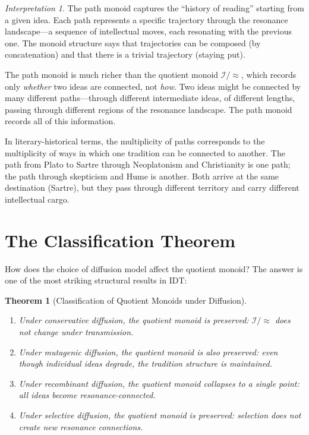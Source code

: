 \documentclass[11pt,openany]{book}
\theoremstyle{definition}
\theoremstyle{plain}
\newtheorem{theorem}[axiom]{Theorem}
\theoremstyle{remark}
\newtheorem{interpretation}[axiom]{Interpretation}
\newcommand{\IS}{\mathcal{I}}               %
\begin{document}
\begin{interpretation}
The path monoid captures the ``history of reading'' starting from a given idea. Each path represents a specific trajectory through the resonance landscape---a sequence of intellectual moves, each resonating with the previous one. The monoid structure says that trajectories can be composed (by concatenation) and that there is a trivial trajectory (staying put).

The path monoid is much richer than the quotient monoid $\IS/{\approx}$, which records only \emph{whether} two ideas are connected, not \emph{how}. Two ideas might be connected by many different paths---through different intermediate ideas, of different lengths, passing through different regions of the resonance landscape. The path monoid records all of this information.

In literary-historical terms, the multiplicity of paths corresponds to the multiplicity of ways in which one tradition can be connected to another. The path from Plato to Sartre through Neoplatonism and Christianity is one path; the path through skepticism and Hume is another. Both arrive at the same destination (Sartre), but they pass through different territory and carry different intellectual cargo.
\end{interpretation}

\section{The Classification Theorem}

How does the choice of diffusion model affect the quotient monoid? The answer is one of the most striking structural results in IDT:

\begin{theorem}[Classification of Quotient Monoids under Diffusion]
\label{thm:classification}
\begin{enumerate}
\item Under conservative diffusion, the quotient monoid is preserved: $\IS/{\approx}$ does not change under transmission.
\item Under mutagenic diffusion, the quotient monoid is also preserved: even though individual ideas degrade, the tradition structure is maintained.
\item Under recombinant diffusion, the quotient monoid collapses to a single point: all ideas become resonance-connected.
\item Under selective diffusion, the quotient monoid is preserved: selection does not create new resonance connections.
\end{enumerate}
\end{theorem}
\end{document}

